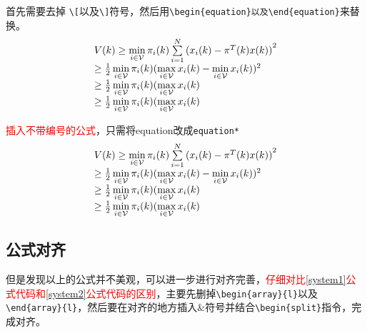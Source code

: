 首先需要去掉 \verb|\[|以及\verb|\]|符号，然后用\verb+\begin{equation}以及\end{equation}+来替换。
\begin{equation}\label{system1}
  \begin{array}{l}
V(k) \ge \mathop {\min }\limits_{i \in {\cal V}} {\pi _i}(k)\sum\limits_{i = 1}^N {{{({x_i}(k) - {\pi ^T}(k)x(k))}^2}} \\
 \ge \frac{1}{2}\mathop {\min }\limits_{i \in {\cal V}} {\pi _i}(k){(\mathop {\max }\limits_{i \in {\cal V}} {x_i}(k) - \mathop {\min }\limits_{i \in {\cal V}} {x_i}(k))^2}\\
 \ge \frac{1}{2}\mathop {\min }\limits_{i \in {\cal V}} {\pi _i}(k)(\mathop {\max }\limits_{i \in {\cal V}} {x_i}(k)\\
 \ge \frac{1}{2}\mathop {\min }\limits_{i \in {\cal V}} {\pi _i}(k)(\mathop {\max }\limits_{i \in {\cal V}} {x_i}(k)
\end{array}
\end{equation}

\textcolor{red}{插入不带编号的公式}，只需将equation改成\verb+equation*+
\begin{equation*}
  \begin{array}{l}
V(k) \ge \mathop {\min }\limits_{i \in {\cal V}} {\pi _i}(k)\sum\limits_{i = 1}^N {{{({x_i}(k) - {\pi ^T}(k)x(k))}^2}} \\
 \ge \frac{1}{2}\mathop {\min }\limits_{i \in {\cal V}} {\pi _i}(k){(\mathop {\max }\limits_{i \in {\cal V}} {x_i}(k) - \mathop {\min }\limits_{i \in {\cal V}} {x_i}(k))^2}\\
 \ge \frac{1}{2}\mathop {\min }\limits_{i \in {\cal V}} {\pi _i}(k)(\mathop {\max }\limits_{i \in {\cal V}} {x_i}(k)\\
 \ge \frac{1}{2}\mathop {\min }\limits_{i \in {\cal V}} {\pi _i}(k)(\mathop {\max }\limits_{i \in {\cal V}} {x_i}(k)
\end{array}
\end{equation*}


\subsection{公式对齐}

但是发现以上的公式并不美观，可以进一步进行对齐完善，\textcolor{red}{仔细对比\eqref{system1}公式代码和\eqref{system2}公式代码的区别}，主要先删掉\verb+\begin{array}{l}+以及\verb+\end{array}{l}+，然后要在对齐的地方插入$\&$符号并结合\verb+\begin{split}+指令，完成对齐。

